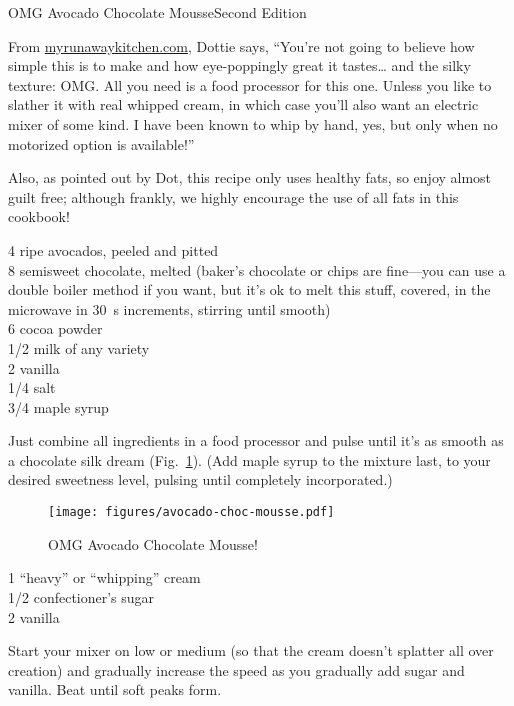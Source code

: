 \begin{entry}{OMG Avocado Chocolate Mousse}{Second Edition}

\begin{open}
  From \url{myrunawaykitchen.com}, Dottie says, ``You’re not going to believe
  how simple this is to make and how eye-poppingly great it tastes… and the
  silky texture: OMG.  All you need is a food processor for this one.  Unless
  you like to slather it with real whipped cream, in which case you’ll also
  want an electric mixer of some kind.  I have been known to whip by hand,
  yes, but only when no motorized option is available!''

  Also, as pointed out by Dot, this recipe only uses healthy fats, so enjoy
  almost guilt free; although frankly, we highly encourage the use of all fats
  in this cookbook!
\end{open}
\begin{ingredients}
    4 ripe avocados, peeled and pitted\\
    \SI{8}{\ounce} semisweet chocolate, melted (baker’s chocolate or chips are fine---you can use a double boiler method if you want, but it's ok to melt this stuff, covered, in the microwave in \SI{30}{\second} increments, stirring until smooth)\\
    \SI{6}{\tblspoon} cocoa powder\\
    \SI{1/2}{\cup} milk of any variety\\
    \SI{2}{\teaspoon} vanilla\\
    \SI{1/4}{\teaspoon} salt\\
    \SI{3/4}{\cup} maple syrup
\end{ingredients}
Just combine all ingredients in a food processor and pulse until it’s as smooth
as a chocolate silk dream (Fig.~\ref{fig:mousse}).  (Add maple syrup to the
mixture last, to your desired sweetness level, pulsing until completely
incorporated.)
\begin{figure}
    \centering
    \texttt{[image: figures/avocado-choc-mousse.pdf]}
    \caption{OMG Avocado Chocolate Mousse!}
    \label{fig:mousse}
\end{figure}


\begin{ingredients}
    \SI{1}{\quart} ``heavy'' or ``whipping'' cream\\
    \SI{1/2}{\cup} confectioner's sugar\\
    \SI{2}{\teaspoon} vanilla
\end{ingredients}
Start your mixer on low or medium (so that the cream doesn't splatter all over
creation) and gradually increase the speed as you gradually add sugar and
vanilla.  Beat until soft peaks form.
\end{entry}

